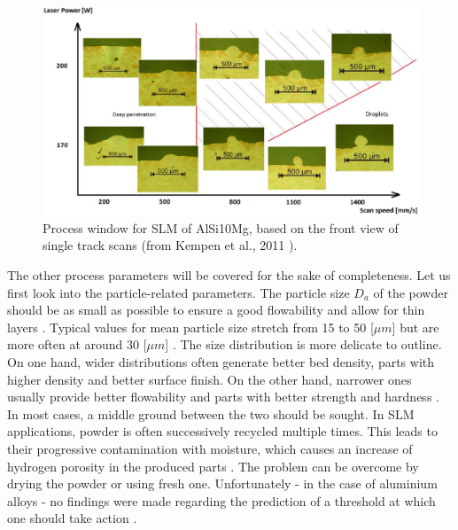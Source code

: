 \begin{figure}[ht]
\centering
\includegraphics[scale=0.34]{Images/Pvs2}
\decoRule
\caption[Process window for SLM of AlSi10Mg, based on the front view of single track scans]{Process window for SLM of AlSi10Mg, based on the front view of single track scans (from Kempen et al., 2011 \parencite{Kempen110817}).}
\label{fig:Pvs2}
\end{figure}

The other process parameters will be covered for the sake of completeness. Let us first look into the particle-related parameters. The particle size $D_a$ of the powder should be as small as possible to ensure a good flowability and allow for thin layers \parencite{Kempen110817}. Typical values for mean particle size stretch from 15 to 50 [$\mu m$] but are more often at around 30 [$\mu m$] \parencite{Brandl121509,Kempen110817,MOWER2016198,UZAN2017229}. The size distribution is more delicate to outline. On one hand, wider distributions often generate better bed density, parts with higher density and better surface finish. On the other hand, narrower ones usually provide better flowability and parts with better strength and hardness \parencite{Liu1101}. In most cases, a middle ground between the two should be sought. In SLM applications, powder is often successively recycled multiple times. This leads to their progressive contamination with moisture, which causes an increase of hydrogen porosity in the produced parts \parencite{Weingarten151102}. The problem can be overcome by drying the powder or using fresh one. Unfortunately - in the case of aluminium alloys - no findings were made regarding the prediction of a threshold at which one should take action \parencite{aboulkhair2017}.    \\

